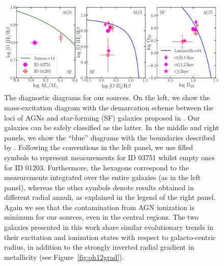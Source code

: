 \begin{figure}
    \includegraphics[width=\textwidth]{fig/bluediagram.pdf}
    \caption[The diagnostic diagrams for our sources.]{The diagnostic diagrams for our sources.
    On the left, we show the mass-excitation diagram
    with the demarcation scheme between the loci of AGNs and 
    star-forming (SF) galaxies proposed in \citet{Juneau:2014ca}. Our galaxies can be safely classified as the 
    latter.
    In the middle and right panels, we show the ``blue'' diagrams with the boundaries described by \citet{Lamareille:2004jk}.
    Following the conventions in the left panel, we use filled symbols to represent measurements for ID 03751 
    whilst empty ones for ID 01203.
    Furthermore, the hexagons correspond to the measurements integrated over the entire galaxies (as in the left 
    panel), whereas the other symbols denote results obtained in different radial annuli, as explained in the 
    legend of the right panel.
    Again we see that the contamination from AGN ionization is minimum for our sources, even in the central 
    regions.
    The two galaxies presented in this work share similar evolutionary trends in their excitation and ionization 
    states with respect to galacto-centric radius, in addition to the strongly inverted radial gradient in 
    metallicity (see Figure~\ref{fig:oh12grad}).
    \label{fig:bluediagram}}
\end{figure}

